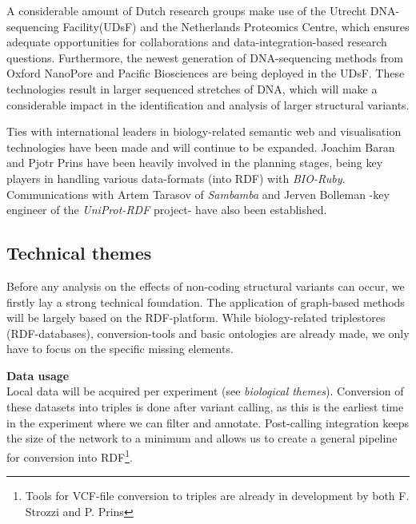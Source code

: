 \documentclass[twoside,fontsize=12pt]{article}
\begin{document}
A considerable amount of Dutch research groups make use of the Utrecht DNA-sequencing Facility(UDsF) and the Netherlands Proteomics Centre, which ensures adequate opportunities for collaborations and data-integration-based research questions. Furthermore, the newest generation of DNA-sequencing methods from Oxford NanoPore and Pacific Biosciences are being deployed in the UDsF. These technologies result in larger sequenced stretches of DNA, which will make a considerable impact in the identification and analysis of larger structural variants.

Ties with international leaders in biology-related semantic web and visualisation technologies have been made and will continue to be expanded. Joachim Baran and Pjotr Prins have been heavily involved in the planning stages, being key players in handling various data-formats (into RDF) with \textit{BIO-Ruby}. Communications with Artem Tarasov of \textit{Sambamba} and Jerven Bolleman -key engineer of the \textit{UniProt-RDF} project- have also been established.
%	
%
%
%



\subsection*{Technical themes}
Before any analysis on the effects of non-coding structural variants can occur, we firstly lay a strong technical foundation. The application of graph-based methods will be largely based on the RDF-platform. While biology-related triplestores (RDF-databases), conversion-tools and basic ontologies are already made, we only have to focus on the specific missing elements.
\medskip

\noindent
\textbf{Data usage} \\
Local data will be acquired per experiment (see \emph{biological themes}). Conversion of these datasets into triples is done after variant calling, as this is the earliest time in the experiment where we can filter and annotate. Post-calling integration keeps the size of the network to a minimum and allows us to create a general pipeline for conversion into RDF\footnote{Tools for VCF-file conversion to triples are already in development by both F. Strozzi and P. Prins\cite{Strozzi2013,biorubyrdf}}.
 
\end{document}
